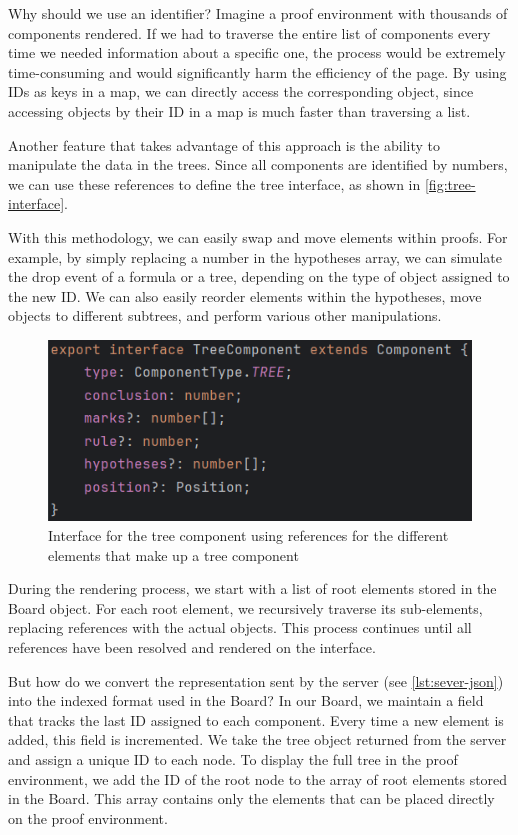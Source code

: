 Why should we use an identifier? Imagine a proof environment with thousands of components rendered. If we had to traverse the entire list of components every time we needed information about a specific one, the process would be extremely time-consuming and would significantly harm the efficiency of the page. By using IDs as keys in a map, we can directly access the corresponding object, since accessing objects by their ID in a map is much faster than traversing a list.

Another feature that takes advantage of this approach is the ability to manipulate the data in the trees. Since all components are identified by numbers, we can use these references to define the tree interface, as shown in \autoref{fig:tree-interface}.

With this methodology, we can easily swap and move elements within proofs. For example, by simply replacing a number in the hypotheses array, we can simulate the drop event of a formula or a tree, depending on the type of object assigned to the new ID. We can also easily reorder elements within the hypotheses, move objects to different subtrees, and perform various other manipulations.

\begin{figure}
    \centering
    \includegraphics[width=0.70\linewidth]{Chapters/Figures/tree-interface.png}
    \caption{Interface for the tree component using references for the different elements that make up a tree component}
    \label{fig:tree-interface}
\end{figure}

During the rendering process, we start with a list of root elements stored in the Board object. For each root element, we recursively traverse its sub-elements, replacing references with the actual objects. This process continues until all references have been resolved and rendered on the interface.

But how do we convert the representation sent by the server (see \autoref{lst:sever-json}) into the indexed format used in the Board? In our Board, we maintain a field that tracks the last ID assigned to each component. Every time a new element is added, this field is incremented. We take the tree object returned from the server and assign a unique ID to each node. To display the full tree in the proof environment, we add the ID of the root node to the array of root elements stored in the Board. This array contains only the elements that can be placed directly on the proof environment.

